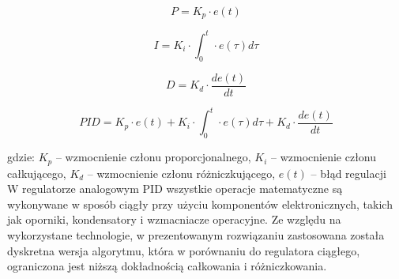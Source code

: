 \documentclass[12pt,twoside]{article}
\begin{document}
\begin{equation}
P = K_p \cdot e(t)
\label{Eq:rownanieP}
\end{equation}

\begin{equation}
I = K_i \cdot \int_0^t \cdot e(\tau)d\tau
\label{Eq:rownanieI}
\end{equation}

\begin{equation}
D = K_d \cdot \frac{de(t)}{dt}
\label{Eq:rownanieD}
\end{equation}


\begin{equation}
PID = K_p \cdot e(t) + K_i \cdot \int_0^t \cdot e(\tau)d\tau + K_d \cdot \frac{de(t)}{dt}
\label{Eq:rownaniePID}
\end{equation}

gdzie: $K_p$ -- wzmocnienie członu proporcjonalnego, $K_i$ -- wzmocnienie członu całkującego, $K_d$ -- wzmocnienie członu różniczkującego, $e(t)$ -- błąd regulacji \\

W regulatorze analogowym PID wszystkie operacje matematyczne są wykonywane w sposób ciągły przy użyciu komponentów elektronicznych, takich jak oporniki, kondensatory i wzmacniacze operacyjne. Ze względu na wykorzystane technologie, w prezentowanym rozwiązaniu zastosowana została dyskretna wersja algorytmu, która w porównaniu do regulatora ciągłego, ograniczona jest niższą dokładnością całkowania i różniczkowania.

\lstset{language=C++}
\end{document}
